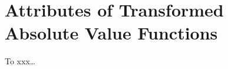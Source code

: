 

\section*{Attributes of Transformed Absolute Value Functions}

\begin{myConceptSteps}{To xxx\dots}
\end{myConceptSteps}
